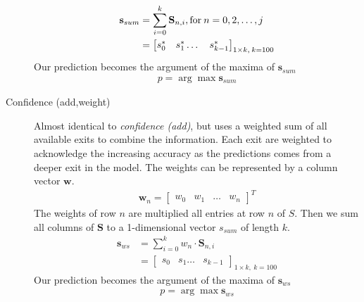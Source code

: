 \begin{description}
	\begin{align*}
	\mathbf{s}_{sum} &= \sum_{i=0}^{k} \mathbf{S}_{n,i}, \text{for\:} n=0, 2, \dots, j\\ 
	&=	\begin{bmatrix}
	s^*_0 & s^*_1 \dots & s^*_{k-1}
	\end{bmatrix}_{1 \times k,\: k=100} 
	\end{align*}
	Our prediction becomes the argument of the maxima of $\mathbf{s}_{sum}$
	\begin{align*}
	p = \arg \max \mathbf{s}_{sum}
	\end{align*}
	
	
	\item[Confidence (add,weight)] Almost identical to \emph{confidence (add)}, but uses a weighted sum of all available exits to combine the information. Each exit are weighted to acknowledge the increasing accuracy as the predictions comes from a deeper exit in the model.  The weights can be represented by a column vector $\mathbf{w}$.
	\begin{align*}
	\mathbf{w}_{n} =
	\begin{bmatrix}
	w_0 &
	w_1 &
	\dots &
	w_n
	\end{bmatrix}^T
	\end{align*}
	The weights of row $n$ are multiplied all entries at row $n$ of $S$. Then we sum all columns of $\mathbf{S}$ to a 1-dimensional vector $s_{sum}$ of length $k$.  
	\begin{align*}
	\mathbf{s}_{ws} &= \sum_{i=0}^{k} w_n \cdot \mathbf{S}_{n,i}\\
	&= 		
	\begin{bmatrix}
	s_0 & s_1 \dots & s_{k-1}
	\end{bmatrix}_{1 \times k,\: k=100} 
	\end{align*}
	Our prediction becomes the argument of the maxima of $\mathbf{s}_{ws}$
	\begin{align*}
	p = \arg \max \mathbf{s}_{ws}
	\end{align*}
	

\end{description}
